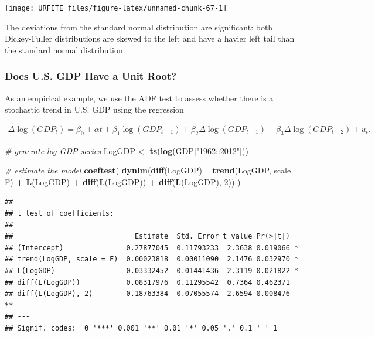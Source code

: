 \documentclass[]{book}
\newenvironment{Shaded}{\begin{snugshade}}{\end{snugshade}}
\newcommand{\KeywordTok}[1]{\textcolor[rgb]{0.13,0.29,0.53}{\textbf{#1}}}
\newcommand{\DataTypeTok}[1]{\textcolor[rgb]{0.13,0.29,0.53}{#1}}
\newcommand{\DecValTok}[1]{\textcolor[rgb]{0.00,0.00,0.81}{#1}}
\newcommand{\StringTok}[1]{\textcolor[rgb]{0.31,0.60,0.02}{#1}}
\newcommand{\CommentTok}[1]{\textcolor[rgb]{0.56,0.35,0.01}{\textit{#1}}}
\newcommand{\OperatorTok}[1]{\textcolor[rgb]{0.81,0.36,0.00}{\textbf{#1}}}
\newcommand{\NormalTok}[1]{#1}
\theoremstyle{definition}
\theoremstyle{definition}
\theoremstyle{definition}
\theoremstyle{remark}
\begin{document}
\begin{center}\texttt{[image: URFITE\_files/figure-latex/unnamed-chunk-67-1]} \end{center}

The deviations from the standard normal distribution are significant:
both Dickey-Fuller distributions are skewed to the left and have a
havier left tail than the standard normal distribution.

\subsubsection*{Does U.S. GDP Have a Unit
Root?}\label{does-u.s.-gdp-have-a-unit-root}

As an empirical example, we use the ADF test to assess whether there is
a stochastic trend in U.S. GDP using the regression

\begin{align*}
  \Delta\log(GDP_t) = \beta_0 + \alpha t + \beta_1 \log(GDP_{t-1}) + \beta_2 \Delta \log(GDP_{t-1}) + \beta_3 \Delta \log(GDP_{t-2}) + u_t.
\end{align*}

\begin{Shaded}
\begin{Highlighting}[]
\CommentTok{# generate log GDP series}
\NormalTok{LogGDP <-}\StringTok{ }\KeywordTok{ts}\NormalTok{(}\KeywordTok{log}\NormalTok{(GDP[}\StringTok{"1962::2012"}\NormalTok{]))}

\CommentTok{# estimate the model}
\KeywordTok{coeftest}\NormalTok{(}
  \KeywordTok{dynlm}\NormalTok{(}\KeywordTok{diff}\NormalTok{(LogGDP) }\OperatorTok{~}\StringTok{ }\KeywordTok{trend}\NormalTok{(LogGDP, }\DataTypeTok{scale =}\NormalTok{ F) }\OperatorTok{+}\StringTok{ }\KeywordTok{L}\NormalTok{(LogGDP) }\OperatorTok{+}\StringTok{ }\KeywordTok{diff}\NormalTok{(}\KeywordTok{L}\NormalTok{(LogGDP)) }\OperatorTok{+}\StringTok{ }\KeywordTok{diff}\NormalTok{(}\KeywordTok{L}\NormalTok{(LogGDP), }\DecValTok{2}\NormalTok{))}
\NormalTok{  )}
\end{Highlighting}
\end{Shaded}

\begin{verbatim}
## 
## t test of coefficients:
## 
##                             Estimate  Std. Error t value Pr(>|t|)   
## (Intercept)               0.27877045  0.11793233  2.3638 0.019066 * 
## trend(LogGDP, scale = F)  0.00023818  0.00011090  2.1476 0.032970 * 
## L(LogGDP)                -0.03332452  0.01441436 -2.3119 0.021822 * 
## diff(L(LogGDP))           0.08317976  0.11295542  0.7364 0.462371   
## diff(L(LogGDP), 2)        0.18763384  0.07055574  2.6594 0.008476 **
## ---
## Signif. codes:  0 '***' 0.001 '**' 0.01 '*' 0.05 '.' 0.1 ' ' 1
\end{verbatim}
\end{document}
